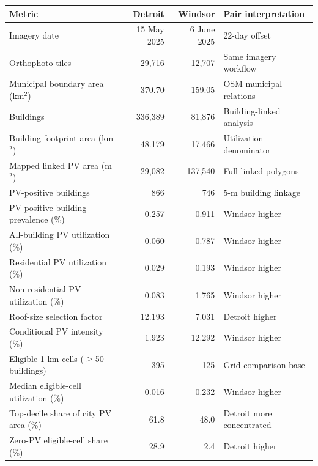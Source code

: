 \begin{tabular}{@{}lrrl@{}}
\toprule
Metric & Detroit & Windsor & Pair interpretation \\
\midrule
Imagery date & 15 May 2025 & 6 June 2025 & 22-day offset \\
Orthophoto tiles & 29,716 & 12,707 & Same imagery workflow \\
Municipal boundary area (km$^{2}$) & 370.70 & 159.05 & OSM municipal relations \\
Buildings & 336,389 & 81,876 & Building-linked analysis \\
Building-footprint area (km$^{2}$) & 48.179 & 17.466 & Utilization denominator \\
Mapped linked PV area (m$^{2}$) & 29,082 & 137,540 & Full linked polygons \\
PV-positive buildings & 866 & 746 & 5-m building linkage \\
PV-positive-building prevalence (\%) & 0.257 & 0.911 & Windsor higher \\
All-building PV utilization (\%) & 0.060 & 0.787 & Windsor higher \\
Residential PV utilization (\%) & 0.029 & 0.193 & Windsor higher \\
Non-residential PV utilization (\%) & 0.083 & 1.765 & Windsor higher \\
Roof-size selection factor & 12.193 & 7.031 & Detroit higher \\
Conditional PV intensity (\%) & 1.923 & 12.292 & Windsor higher \\
Eligible 1-km cells ($\geq$50 buildings) & 395 & 125 & Grid comparison base \\
Median eligible-cell utilization (\%) & 0.016 & 0.232 & Windsor higher \\
Top-decile share of city PV area (\%) & 61.8 & 48.0 & Detroit more concentrated \\
Zero-PV eligible-cell share (\%) & 28.9 & 2.4 & Detroit higher \\
\bottomrule
\end{tabular}
